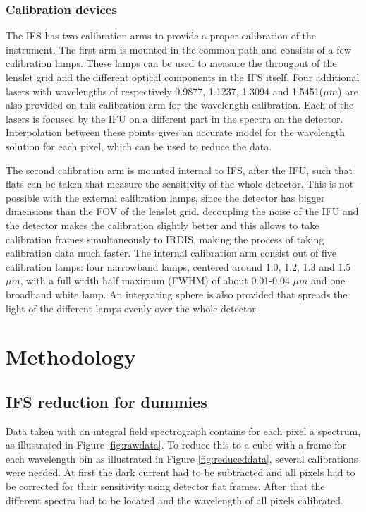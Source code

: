 \documentclass[twoside,single]{lion-msc}
\begin{document}
\subsection{Calibration devices}
The IFS has two calibration arms to provide a proper calibration of the instrument. The first arm is mounted in the common path and consists of a few calibration lamps. These lamps can be used to measure the througput of the lenslet grid and the different optical components in the IFS itself. Four additional lasers with wavelengths of respectively 0.9877, 1.1237, 1.3094 and 1.5451($\mu m$) are also provided on this calibration arm for the wavelength calibration. Each of the lasers is focused by the IFU on a different part in the spectra on the detector. Interpolation between these points gives an accurate model for the wavelength solution for each pixel, which can be used to reduce the data.
\bigskip

The second calibration arm is mounted internal to IFS, after the IFU, such that flats can be taken that measure the sensitivity of the whole detector. This is not possible with the external calibration lamps, since the detector has bigger dimensions than the FOV of the lenslet grid. decoupling the noise of the IFU and the detector makes the calibration slightly better and this allows to take calibration frames simultaneously to IRDIS, making the process of taking calibration data much faster. The internal calibration arm consist out of five calibration lamps: four narrowband lamps, centered around 1.0, 1.2, 1.3 and 1.5 $\mu m$, with a full width half maximum (FWHM) of about 0.01-0.04 $\mu m$ and one broadband white lamp\citep{Desidera}. An integrating sphere is also provided that spreads the light of the different lamps evenly over the whole detector.

\chapter{Methodology}
\section{IFS reduction for dummies}
Data taken with an integral field spectrograph contains for each pixel a spectrum, as illustrated in Figure \ref{fig:rawdata}. To reduce this to a cube with a frame for each wavelength bin as illustrated in Figure \ref{fig:reduceddata}, several calibrations were needed. At first the dark current had to be subtracted and all pixels had to be corrected for their sensitivity using detector flat frames. After that the different spectra had to be located and the wavelength of all pixels calibrated. 
\end{document}
